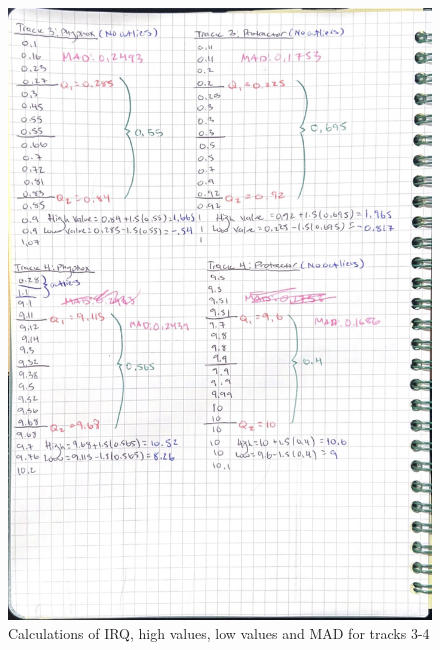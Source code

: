 \documentclass[idxtotoc,hyperref,openany]{labbook} %
\begin{document}
\begin{figure}[H] %
\begin{center}
\includegraphics[width=0.9\linewidth]{images/PhyProTrack3-4.png}
\end{center}
\caption{Calculations of IRQ, high values, low values and MAD for tracks 3-4}
\label{fig:Track3-4PhyphoxProtractor}
\end{figure}
\end{document}
